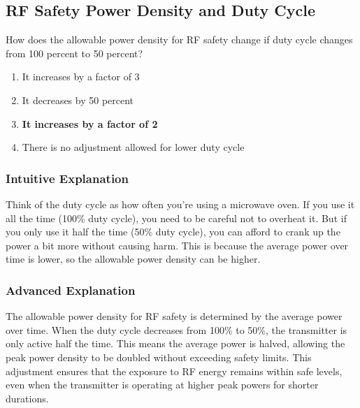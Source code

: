 \subsection{RF Safety Power Density and Duty Cycle}
\label{T0C03}

\begin{tcolorbox}[colback=gray!10!white,colframe=black!75!black,title=T0C03]
How does the allowable power density for RF safety change if duty cycle changes from 100 percent to 50 percent?
\begin{enumerate}[noitemsep]
    \item It increases by a factor of 3
    \item It decreases by 50 percent
    \item \textbf{It increases by a factor of 2}
    \item There is no adjustment allowed for lower duty cycle
\end{enumerate}
\end{tcolorbox}

\subsubsection*{Intuitive Explanation}
Think of the duty cycle as how often you're using a microwave oven. If you use it all the time (100\% duty cycle), you need to be careful not to overheat it. But if you only use it half the time (50\% duty cycle), you can afford to crank up the power a bit more without causing harm. This is because the average power over time is lower, so the allowable power density can be higher.

\subsubsection*{Advanced Explanation}
The allowable power density for RF safety is determined by the average power over time. When the duty cycle decreases from 100\% to 50\%, the transmitter is only active half the time. This means the average power is halved, allowing the peak power density to be doubled without exceeding safety limits. This adjustment ensures that the exposure to RF energy remains within safe levels, even when the transmitter is operating at higher peak powers for shorter durations.